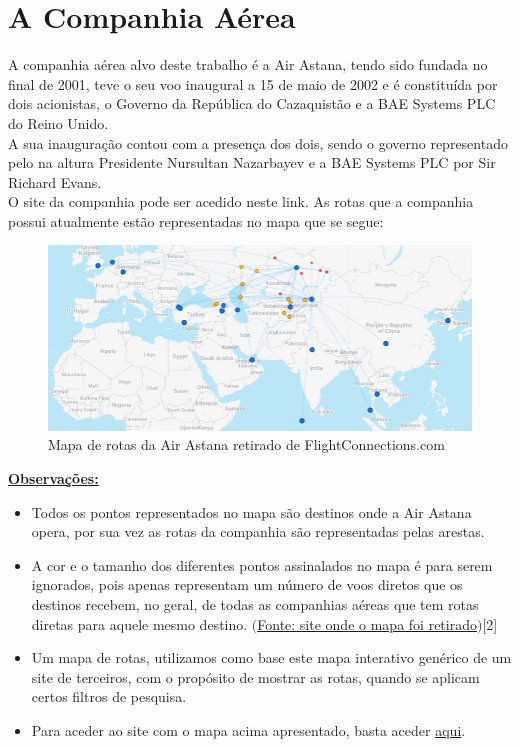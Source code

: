 \chapter{A Companhia Aérea}
\label{chapter:Companhia Aérea}
A companhia aérea alvo deste trabalho é a Air Astana, tendo sido fundada no final de 2001, teve o seu voo
inaugural a 15 de maio de 2002 e é constituída por dois acionistas, o Governo da República do Cazaquistão e a 
BAE Systems PLC do Reino Unido.\\
A sua inauguração contou com a presença dos dois, sendo o governo 
representado pelo na altura Presidente Nursultan Nazarbayev e a BAE Systems PLC por Sir Richard Evans.\\
O site da companhia pode ser acedido neste link.
As rotas que a companhia possui atualmente estão representadas no mapa que se segue:

\begin{figure}[h]
        \centering
        \includegraphics[width=1\textwidth]{imgs/Figura1}
        \caption{Mapa de rotas da Air Astana retirado de FlightConnections.com\label{fig:imagem1}}
\end{figure}

\noindent\underline{\textbf{Observações:}}\\
\begin{itemize}
\item Todos os pontos representados no mapa são destinos onde a Air Astana opera, por sua vez as rotas da
companhia são representadas pelas arestas.
\item A cor e o tamanho dos diferentes pontos assinalados no mapa é para serem ignorados, pois apenas
representam um número de voos diretos que os destinos recebem, no geral, de todas as companhias aéreas 
que tem rotas diretas para aquele mesmo destino. \href{https://www.flightconnections.com}{$($Fonte: site onde o mapa foi retirado$)$}[2]

\item Um mapa de rotas, utilizamos como base este mapa interativo genérico de um site de terceiros, com o
propósito de mostrar as rotas, quando se aplicam certos filtros de pesquisa.
\item Para aceder ao site com o mapa acima apresentado, basta aceder \href{https://www.flightconnections.com/route-map-air-astana-kc}{aqui}.
\end{itemize}
\clearpage
